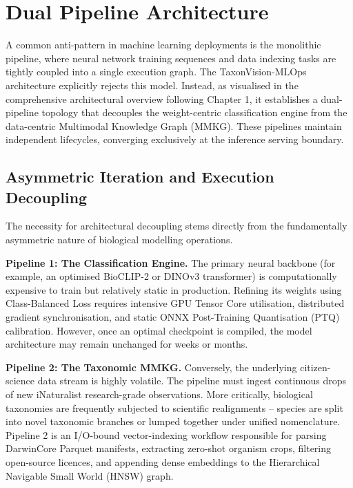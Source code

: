\chapter{Dual Pipeline Architecture}
\label{ch:dual_pipeline}

A common anti-pattern in machine learning deployments is the monolithic pipeline, where neural network training sequences and data indexing tasks are tightly coupled into a single execution graph. The TaxonVision-MLOps architecture explicitly rejects this model. Instead, as visualised in the comprehensive architectural overview following Chapter 1, it establishes a dual-pipeline topology that decouples the weight-centric classification engine from the data-centric Multimodal Knowledge Graph (MMKG). These pipelines maintain independent lifecycles, converging exclusively at the inference serving boundary.

\section{Asymmetric Iteration and Execution Decoupling}
\label{sec:decoupling}

The necessity for architectural decoupling stems directly from the fundamentally asymmetric nature of biological modelling operations.

\textbf{Pipeline 1: The Classification Engine.} The primary neural backbone (for example, an optimised BioCLIP-2 \cite{stevens2024bioclip} or DINOv3 transformer) is computationally expensive to train but relatively static in production. Refining its weights using Class-Balanced Loss \cite{cui2019classbalanced} requires intensive GPU Tensor Core utilisation, distributed gradient synchronisation, and static ONNX Post-Training Quantisation (PTQ) calibration. However, once an optimal checkpoint is compiled, the model architecture may remain unchanged for weeks or months.

\textbf{Pipeline 2: The Taxonomic MMKG.} Conversely, the underlying citizen-science data stream is highly volatile. The pipeline must ingest continuous drops of new iNaturalist research-grade observations. More critically, biological taxonomies are frequently subjected to scientific realignments -- species are split into novel taxonomic branches or lumped together under unified nomenclature. Pipeline 2 is an I/O-bound vector-indexing workflow responsible for parsing DarwinCore Parquet manifests, extracting zero-shot organism crops, filtering open-source licences, and appending dense embeddings to the Hierarchical Navigable Small World (HNSW) graph.


